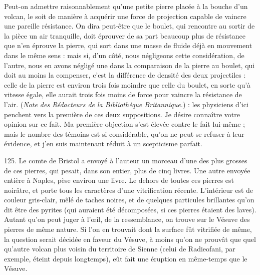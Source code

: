 \documentclass[a4paper, 11pt, oneside, polutonikogreek, french]{article}
\begin{document}
{\hspace*{5mm}Peut-on admettre raisonnablement qu'une petite pierre placée à la bouche d'un volcan, le soit de manière à acquérir une force de projection capable de vaincre une pareille résistance. On dira peut-être que le boulet, qui rencontre au sortir de la pièce un air tranquille, doit éprouver de sa part beaucoup plus de résistance que n'en éprouve la pierre, qui sort dans une masse de fluide déjà en mouvement dans le même sens : mais si, d'un côté, nous négligeons cette considération, de l'autre, nous en avons négligé une dans la comparaison de la pierre au boulet, qui doit au moins la compenser, c'est la différence de densité des deux projectiles : celle de la pierre est environ trois fois moindre que celle du boulet, en sorte qu'à vitesse égale, elle aurait trois fois moins de force pour vaincre la résistance de l'air. (\emph{Note des Rédacteurs de la Bibliothèque Britannique.})} : les physiciens d'ici penchent vers la première de ces deux suppositions. Je désire connaître votre opinion sur ce fait. Ma première objection s'est élevée contre le fait lui-même ; mais le nombre des témoins est si considérable, qu'on ne peut se refuser à leur évidence, et j'en suis maintenant réduit à un scepticisme parfait. \fg
 
125. Le comte de Bristol a envoyé à l'auteur un morceau d'une des plus grosses de ces pierres, qui pesait, dans son entier, plus de cinq livres. Une autre envoyée entière à Naples, pèse environ une livre. Le dehors de toutes ces pierres est noirâtre, et porte tous les caractères d'une vitrification récente. L'intérieur est de couleur gris-clair, mêlé de taches noires, et de quelques particules brillantes qu'on dit être des pyrites (qui auraient été décomposées, si ces pierres étaient des laves). Autant qu'on peut juger à l'œil, de la ressemblance, on trouve sur le Vésuve des pierres de même nature. Si l'on en trouvait dont la surface fût vitrifiée de même, la question serait décidée en faveur du Vésuve, à moins qu'on ne prouvât que quel qu’autre volcan plus voisin du territoire de Sienne (celui de Radieofani, par exemple, éteint depuis longtemps), eût fait une éruption en même-temps que le Vésuve.
\end{document}
